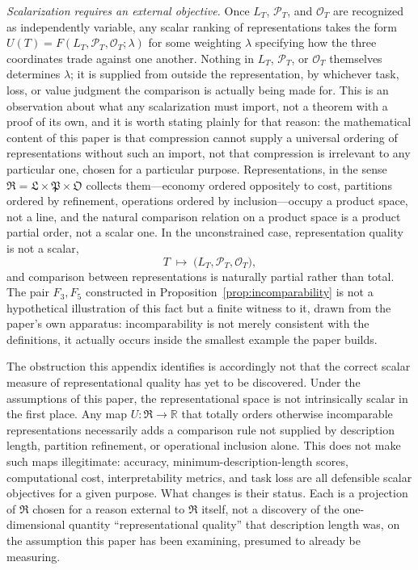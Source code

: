 \documentclass[11pt]{article}
\theoremstyle{plain}
\begin{document}
\emph{Scalarization requires an external objective.} Once $L_T$, $\mathcal{P}_T$, and $\mathcal{O}_T$ are recognized as independently variable, any scalar ranking of representations takes the form $U(T) = F(L_T, \mathcal{P}_T, \mathcal{O}_T; \lambda)$ for some weighting $\lambda$ specifying how the three coordinates trade against one another. Nothing in $L_T$, $\mathcal{P}_T$, or $\mathcal{O}_T$ themselves determines $\lambda$; it is supplied from outside the representation, by whichever task, loss, or value judgment the comparison is actually being made for. This is an observation about what any scalarization must import, not a theorem with a proof of its own, and it is worth stating plainly for that reason: the mathematical content of this paper is that compression cannot supply a universal ordering of representations without such an import, not that compression is irrelevant to any particular one, chosen for a particular purpose. Representations, in the sense $\mathfrak{R} = \mathfrak{L} \times \mathfrak{P} \times \mathfrak{O}$ collects them---economy ordered oppositely to cost, partitions ordered by refinement, operations ordered by inclusion---occupy a product space, not a line, and the natural comparison relation on a product space is a product partial order, not a scalar one. In the unconstrained case, representation quality is not a scalar,
\[
T \; \mapsto \; \bigl(L_T, \mathcal{P}_T, \mathcal{O}_T\bigr),
\]
and comparison between representations is naturally partial rather than total. The pair $F_3, F_5$ constructed in Proposition~\ref{prop:incomparability} is not a hypothetical illustration of this fact but a finite witness to it, drawn from the paper's own apparatus: incomparability is not merely consistent with the definitions, it actually occurs inside the smallest example the paper builds.

The obstruction this appendix identifies is accordingly not that the correct scalar measure of representational quality has yet to be discovered. Under the assumptions of this paper, the representational space is not intrinsically scalar in the first place. Any map $U : \mathfrak{R} \to \mathbb{R}$ that totally orders otherwise incomparable representations necessarily adds a comparison rule not supplied by description length, partition refinement, or operational inclusion alone. This does not make such maps illegitimate: accuracy, minimum-description-length scores, computational cost, interpretability metrics, and task loss are all defensible scalar objectives for a given purpose. What changes is their status. Each is a projection of $\mathfrak{R}$ chosen for a reason external to $\mathfrak{R}$ itself, not a discovery of the one-dimensional quantity ``representational quality'' that description length was, on the assumption this paper has been examining, presumed to already be measuring.
\end{document}
